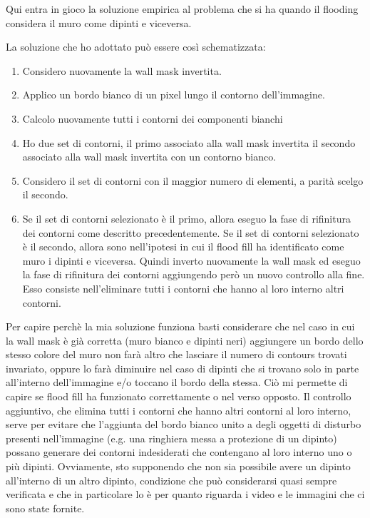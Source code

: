 \documentclass[10pt,twocolumn,letterpaper]{article}
\begin{document}
Qui entra in gioco la soluzione empirica al problema che si ha quando il flooding considera il muro come dipinti e viceversa. 

La soluzione che ho adottato può essere così schematizzata:
\begin{enumerate}
   \item Considero nuovamente la wall mask invertita.
   \item Applico un bordo bianco di un pixel lungo il contorno dell'immagine.
   \item Calcolo nuovamente tutti i contorni dei componenti bianchi
   \item Ho due set di contorni, il primo associato alla wall mask invertita il secondo associato alla wall mask invertita con un contorno bianco.
   \item Considero il set di contorni con il maggior numero di elementi, a parità scelgo il secondo.
   \item Se il set di contorni selezionato è il primo, allora eseguo la fase di rifinitura dei contorni come descritto precedentemente. Se il set di contorni selezionato è il secondo, allora sono nell'ipotesi in cui il flood fill ha identificato come muro i dipinti e viceversa. Quindi inverto nuovamente la wall mask ed eseguo la fase di rifinitura dei contorni aggiungendo però un nuovo controllo alla fine. Esso consiste nell'eliminare tutti i contorni che hanno al loro interno altri contorni.
\end{enumerate}

Per capire perchè la mia soluzione funziona basti considerare che nel caso in cui la wall mask è già corretta (muro bianco e dipinti neri) aggiungere un bordo dello stesso colore del muro non farà altro che lasciare il numero di contours trovati invariato, oppure lo farà diminuire nel caso di dipinti che si trovano solo in parte all'interno dell'immagine e/o toccano il bordo della stessa. Ciò mi permette di capire se flood fill ha funzionato correttamente o nel verso opposto. Il controllo aggiuntivo, che elimina tutti i contorni che hanno altri contorni al loro interno, serve per evitare che l'aggiunta del bordo bianco unito a degli oggetti di disturbo presenti nell'immagine (e.g. una ringhiera messa a protezione di un dipinto) possano generare dei contorni indesiderati che contengano al loro interno uno o più dipinti. Ovviamente, sto supponendo che non sia possibile avere un dipinto all'interno di un altro dipinto, condizione che può considerarsi quasi sempre verificata e che in particolare lo è per quanto riguarda i video e le immagini che ci sono state fornite.
\end{document}
